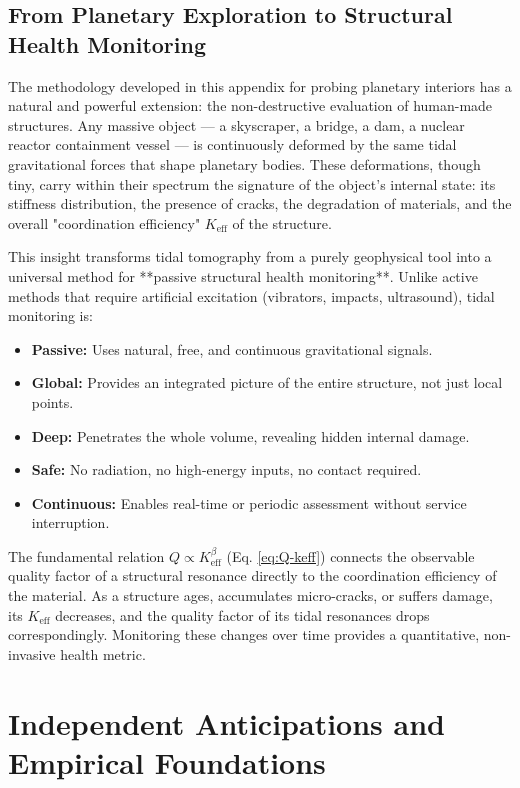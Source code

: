 \documentclass[12pt,a4paper]{article}
\theoremstyle{remark}
\begin{document}
	\subsection{From Planetary Exploration to Structural Health Monitoring}
	\label{sec:beyond-geophysics}
	
	The methodology developed in this appendix for probing planetary interiors has a natural and powerful extension: the non-destructive evaluation of human-made structures. Any massive object — a skyscraper, a bridge, a dam, a nuclear reactor containment vessel — is continuously deformed by the same tidal gravitational forces that shape planetary bodies. These deformations, though tiny, carry within their spectrum the signature of the object's internal state: its stiffness distribution, the presence of cracks, the degradation of materials, and the overall "coordination efficiency" \(K_{\mathrm{eff}}\) of the structure.
	
	This insight transforms tidal tomography from a purely geophysical tool into a universal method for **passive structural health monitoring**. Unlike active methods that require artificial excitation (vibrators, impacts, ultrasound), tidal monitoring is:
	\begin{itemize}
		\item \textbf{Passive:} Uses natural, free, and continuous gravitational signals.
		\item \textbf{Global:} Provides an integrated picture of the entire structure, not just local points.
		\item \textbf{Deep:} Penetrates the whole volume, revealing hidden internal damage.
		\item \textbf{Safe:} No radiation, no high-energy inputs, no contact required.
		\item \textbf{Continuous:} Enables real-time or periodic assessment without service interruption.
	\end{itemize}
	
	The fundamental relation \(Q \propto K_{\mathrm{eff}}^{\beta}\) (Eq. \ref{eq:Q-keff}) connects the observable quality factor of a structural resonance directly to the coordination efficiency of the material. As a structure ages, accumulates micro-cracks, or suffers damage, its \(K_{\mathrm{eff}}\) decreases, and the quality factor of its tidal resonances drops correspondingly. Monitoring these changes over time provides a quantitative, non-invasive health metric.
	
	\section{Independent Anticipations and Empirical Foundations}
	\label{sec:prior}
	
\end{document}
